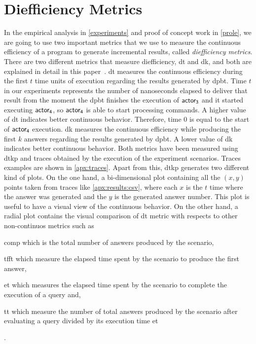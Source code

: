 \section{Diefficiency Metrics}\label{prem:dief}
In the empirical analysis in \autoref{experiments} and proof of concept work in \autoref{prole}, we are going to use two important metrics that we use to measure the continuous efficiency of a program to generate incremental results, called \emph{diefficiency metrics}.
There are two different metrics that measure diefficiency, \acrfull{dt} and \acrfull{dk}, and both are explained in detail in this paper~\cite{diefpaper}.
\acrshort{dt} measures the continuous efficiency during the first $t$ time units of execution regarding the results generated by \acrshort{dpbt}. Time $t$ in our experiments represents the number of nanoseconds elapsed to deliver that result from the moment the \acrshort{dpbt} finishes the execution of $\mathsf{actor_3}$ and it started executing $\mathsf{actor_4}$, so $\mathsf{actor_4}$ is able to start processing commands. A higher value of \acrshort{dt} indicates better continuous behavior.
Therefore, time $0$ is equal to the start of $\mathsf{actor_4}$ execution.
\acrshort{dk} measures the continuous efficiency while producing the first $k$ answers regarding the results generated by \acrshort{dpbt}. A lower value of \acrshort{dk} indicates better continuous behavior.
Both metrics have been measured using \acrfull{dtkp} and traces obtained by the execution of the experiment scenarios. Traces examples are shown in \autoref{apx:traces}.
Apart from this, \acrshort{dtkp} generates two different kind of plots. On the one hand, a bi-dimensional plot containing all the $(x,y)$ points taken from traces like \autoref{apx:results:csv}, where each $x$ is the $t$ time where the answer was generated and the $y$ is the generated answer number.
This plot is useful to have a visual view of the continuous behavior. On the other hand, a radial plot contains the visual comparison of \acrshort{dt} metric with respects to other non-continuos metrics such as 
\begin{inparaenum}[\bf i\upshape)]
  \item \acrfull{comp} which is the total number of answers produced by the scenario, 
  \item \acrfull{tfft} which measure the elapsed time spent by the scenario to produce the first answer, 
  \item \acrfull{et} which measures the elapsed time spent by the scenario to complete the execution of a query and, 
  \item \acrfull{tt} which measure the number of total answers produced by the scenario after evaluating a query divided by its execution time \acrshort{et}
\end{inparaenum}.


